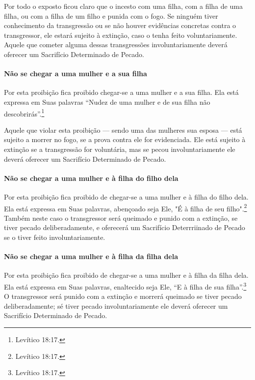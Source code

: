 Por todo o exposto ficou claro que o incesto com uma filha, com a filha de uma filha, ou com a filha de um filho e punida com o fogo. Se
ninguém tiver conhecimento da transgressão ou se não houver evidências
concretas contra o transgressor, ele estará sujeito à extinção, caso o
tenha feito voluntariamente. Aquele que cometer alguma dessas
transgressões involuntariamente deverá oferecer um Sacrifício
Determinado de Pecado.

\paragraph{Não se chegar a uma mulher e a sua filha}

Por esta proibição fica proibido chegar-se a uma mulher e a sua filha.
Ela está expressa em Suas palavras ``Nudez de uma mulher e de sua filha
não descobrirás''.\footnote{Levítico 18:17.}

Aquele que violar esta proibição --- sendo uma das mulheres sua esposa
--- está sujeito a morrer no fogo, se a prova contra ele for
evidenciada. Ele está sujeito à extinção se a transgressão for
voluntária, mas se pecou involuntariamente ele deverá oferecer um
Sacrifício Determinado de Pecado.

\paragraph{Não se chegar a uma mulher e à filha do filho dela}

Por esta proibição fica proibido de chegar-se a uma mulher e à filha do
filho dela. Ela está expressa em Suas palavras, abençoado seja Ele, "É à
filha de seu filho".\footnote{Levítico 18:17.} Também neste caso o transgressor
será queimado e punido com a extinção, se tiver pecado deliberadamente,
e oferecerá um Sacrifício Deterrriinado de Pecado se o tiver feito
involuntariamente.

\paragraph{Não se chegar a uma mulher e à filha da filha dela}

Por esta proibição fica proibido de chegar-se a uma mulher e à filha da
filha dela. Ela está expressa em Suas palavras, enaltecido seja Ele, ``E
à filha de sua filha''.\footnote{Levítico 18:17.} O transgressor será punido com
a extinção e morrerá queimado se tiver pecado deliberadamente; sé tiver
pecado involuntariamente ele deverá oferecer um Sacrifício Determinado
de Pecado.

